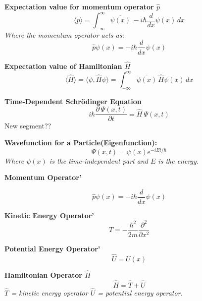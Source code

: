 \documentclass[a4paper,11pt]{article}
\renewcommand{\textbf}[1]{{\scriptsize	\bfseries #1}}
\begin{document}
\begin{footnotesize}
\begin{multicols}{2}
\begin{minipage}{\linewidth}
\textbf{Expectation value for momentum operator $\hat{p}$}
\[
\langle p \rangle = \int_{-\infty}^{\infty} \overline{\psi(x)} \, -i \hbar \frac{d}{dx} \psi(x) \, dx
\]
\textit{Where the momentum operator acts as:}
\[
\hat{p} \psi(x) = -i \hbar \frac{d}{dx} \psi(x)
\]

\end{minipage}
\begin{minipage}{\linewidth}
\textbf{Expectation value of Hamiltonian $\hat{H}$}
\[
\langle \hat{H} \rangle= \langle \psi, \hat{H} \psi \rangle = \int_{-\infty}^{\infty} \overline{\psi(x)}\, \hat{H}  \psi(x) \, dx 
\]

\end{minipage}

\begin{minipage}{\linewidth}
\textbf{Time-Dependent Schrödinger Equation }
\[
    i\hbar \frac{\partial \: \Psi(x,t)}{\partial t}  = \hat{H} \:\Psi(x,t)
\]
New segment??
\end{minipage}
\begin{minipage}{\linewidth}

\textbf{Wavefunction for a Particle(Eigenfunction):} \\[-0.2cm]
\[
\Psi(x, t) = \psi(x) e^{-iEt/\hbar}
\]
\textit{Where $\psi(x)$ is the time-independent part and $E$ is the energy.}
\end{minipage}

\begin{minipage}{\linewidth}
\textbf{Momentum Operator'}

\[
\hat{p} \psi(x) = -i\hbar \frac{d}{dx} \psi(x)
\]
\end{minipage}
\begin{minipage}{\linewidth}
\textbf{Kinetic Energy Operator'}
\[
    \hat{T} = -\frac{\hbar^2}{2m} \frac{\partial^2}{\partial x^2}
    \]
\end{minipage}
\begin{minipage}{\linewidth}
\textbf{Potential Energy Operator'}
\[
    \hat{U} = U(x)
    \]
\end{minipage}

\begin{minipage}{\linewidth}

\textbf{Hamiltonian Operator $\hat{H}$}
\[
    \hat{H} = \hat{T} + \hat{U}
\]
\textit{$\hat{T}$ = kinetic energy operator  
$\hat{U}$ = potential energy operator.}

\end{minipage}
\begin{minipage}{\linewidth}


\end{minipage}
\end{multicols}
\end{footnotesize}
\end{document}
